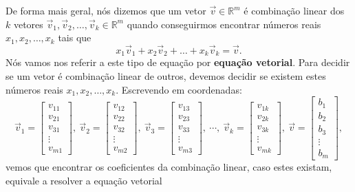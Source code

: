 De forma mais geral, nós dizemos que um vetor $\vec{v} \in \mathbb{R}^m$ é combinação linear dos $k$ vetores $\vec{v}_1, \vec{v}_2, \dots, \vec{v}_k  \in \mathbb{R}^m$ quando conseguirmos encontrar números reais $x_1, x_2, \dots, x_k$ tais que
\begin{equation}
x_1 \vec{v}_1 + x_2 \vec{v}_2 + \dots + x_k \vec{v}_k = \vec{v}.
\end{equation} Nós vamos nos referir a este tipo de equação por \textbf{equação vetorial}. Para decidir se um vetor é combinação linear de outros, devemos decidir se existem estes números reais $x_1, x_2, \dots, x_k$. Escrevendo em coordenadas:
\begin{equation}
\vec{v}_1 =
\left[
  \begin{array}{c}
    v_{11} \\
    v_{21} \\
    v_{31} \\
    \vdots \\
    v_{m1}
  \end{array}
\right], \
\vec{v}_2 =
\left[
  \begin{array}{c}
    v_{12} \\
    v_{22} \\
    v_{32} \\
    \vdots \\
    v_{m2}
  \end{array}
\right], \
\vec{v}_3 =
\left[
  \begin{array}{c}
    v_{13} \\
    v_{23} \\
    v_{33} \\
    \vdots \\
    v_{m3}
  \end{array}
\right], \ \cdots, \
\vec{v}_k =
\left[
  \begin{array}{c}
    v_{1k} \\
    v_{2k} \\
    v_{3k} \\
    \vdots \\
    v_{mk}
  \end{array}
\right], \
\vec{v} =
\left[
  \begin{array}{c}
    b_{1} \\
    b_{2} \\
    b_{3} \\
    \vdots \\
    b_{m}
  \end{array}
\right],
\end{equation} vemos que encontrar os coeficientes da combinação linear, caso estes existam, equivale a resolver a equação vetorial
